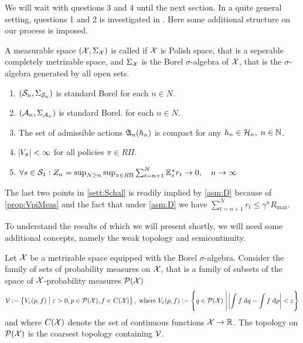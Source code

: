 We will wait with questions 3 and 4 until the next section.
In a quite general setting, questions 1 and 2
is investigated in .
Here some additional structure on our process is imposed.

\begin{defn}
  A measurable space $(\mathcal{X}, \Sigma_\mathcal{X})$ is called
   if $\mathcal{X}$ is Polish space, that is a
  seperable completely metrizable space, and $\Sigma_\mathcal{X}$ is
  the Borel $\sigma$-algebra of $\mathcal{X}$, that is the $\sigma$-algebra
  generated by all open sets.
  \label{defn:standardBorelp}
\end{defn}

\begin{sett}[Schäl]
  \leavevmode
  \begin{enumerate}
    \item $(\mathcal{S}_n, \Sigma_{\mathcal{S}_n})$ is standard Borel
      for each $n \in N$.
    \item $(\mathcal{A}_n, \Sigma_{\mathcal{A}_n})$ is standard Borel.
      for each $n \in N$.
    \item The set of admissible actions
      $\frak{A}_n(h_n)$ is compact for any $h_n \in \mathcal{H}_n, \; n \in \mathbb{N}$.
    \item $\abs{V_\pi} < \infty$ for all policies $\pi \in R\Pi$.
    \item 
      $ \forall s \in \mathcal{S}_1 :
	Z_n = \sup_{N \geq n} \sup_{\pi \in R\Pi} \sum_{t=n+1}^N
      \mathbb{E}_s^\pi r_t \to 0, \quad n \to \infty $
  \end{enumerate}
  \label{sett:Schal}
\end{sett}
\begin{rem}
  The last two points in \cref{sett:Schal} is readily implied by
  \cref{asm:D} because of \cref{prop:VpiMeas} and the fact that under
  \cref{asm:D} we have
  $\sum_{t=n+1}^N r_t \leq \gamma^n R_{\max}$.
\end{rem}

To understand the results of  which we will present shortly,
we will need some additional concepts, namely the weak topology and
semicontinuity.

\begin{defn}
  Let $\mathcal{X}$ be a metrizable space equipped with the Borel $\sigma$-algebra.
  Consider the family of sets of probability measures on $\mathcal{X}$,
  that is a family of subsets of the space of $\mathcal{X}$-probability measures
  $\mathcal{P}(\mathcal{X})$
  \[ \mathcal{V} \vcentcolon= \left\{ V_\varepsilon(p, f) \;\middle\vert\; \varepsilon > 0, p \in \mathcal{P}(\mathcal{X}),
    f \in C(\mathcal{X}) \right\}, \; \mathrm{where} \;
    V_\varepsilon(p, f) \vcentcolon= \left\{ q \in \mathcal{P}(\mathcal{X}) \;\middle\vert\;
  \abs{\int f \; \mathrm{d} q - \int f \; \mathrm{d} p} < \varepsilon \right\} \]
  and where $C(\mathcal{X})$ denote the set of continuous functions $\mathcal{X} \to \mathbb{R}$.
  The  topology on $\mathcal{P}(\mathcal{X})$ is the coarsest topology
  containing $\mathcal{V}$.
  \label{defn:weakTop}
\end{defn}

